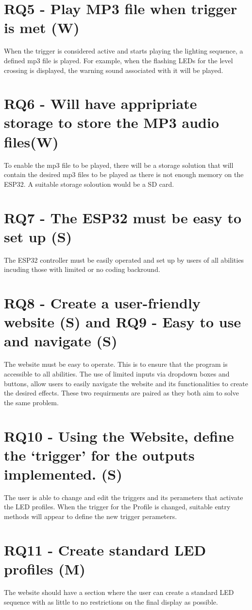 \section {RQ5 - Play MP3 file when trigger is met (W)}
When the trigger is considered active and starts playing the lighting sequence, a defined mp3 file is played. For example, when the flashing LEDs for the level crossing is displayed, the warning sound associated with it will be played. 

\section {RQ6 - Will have appripriate storage to store the MP3 audio files(W)}
To enable the mp3 file to be played, there will be a storage solution that will contain the desired mp3 files to be played as there is not enough memory on the ESP32. A suitable storage soloution would be a SD card. 

\section {RQ7 - The ESP32 must be easy to set up (S)}
The ESP32 controller must be easily operated and set up by users of all abilities incuding those with limited or no coding backround.

\section {RQ8 - Create a user-friendly website (S) and RQ9 - Easy to use and navigate (S)}
The website must be easy to operate. This is to ensure that the program is accessible to all abilities. The use of limited inputs via dropdown boxes and buttons, allow users to easily navigate the website and its functionalities to create the desired effects. These two requirments are paired as they both aim to solve the same problem.

\section {RQ10 - Using the Website, define the ‘trigger’ for the outputs implemented. (S)}
The user is able to change and edit the triggers and its perameters that activate the LED profiles. When the trigger for the Profile is changed, suitable entry methods will appear to define the new trigger perameters. 

\section {RQ11 - Create standard LED profiles (M)}
The website should have a section where the user can create a standard LED sequence with as little to no restrictions on the final display as possible. 

